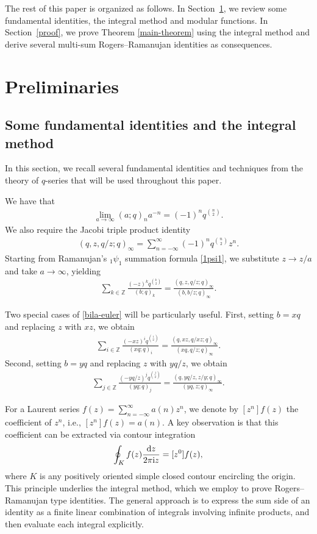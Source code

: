 \documentclass[pdftex]{sigma}
\numberwithin{equation}{section}
\theoremstyle{definition}
\begin{document}
The rest of this paper is organized as follows. In Section~\ref{sec-pre}, we review some fundamental identities, the integral method and modular functions. In Section~\ref{proof}, we prove Theorem \ref{main-theorem} using the integral method and derive several multi-sum Rogers--Ramanujan identities as consequences.

\section{Preliminaries}\label{sec-pre}
\subsection{Some fundamental identities and the integral method}
In this section, we recall several fundamental identities and techniques from the theory of $q$-series that will be used throughout this paper.\par
We have that
\begin{align*}
 \lim_{a\rightarrow \infty}(a;q)_na^{-n}=(-1)^{n}q^{\binom{n}{2}}.
\end{align*}
We also require the Jacobi triple product identity \cite[p.~15]{red}
\begin{align*}
 (q,z,q/z;q)_\infty=\sum_{n=-\infty}^{\infty}(-1)^nq^{\binom{n}{2}}z^n.
\end{align*}
Starting from Ramanujan's $_1\psi_1$ summation formula \eqref{1psi1}, we substitute $z\rightarrow z/a$ and take $a\rightarrow \infty$, yielding
\begin{align}\label{bila-euler}
 \sum_{k\in \mathbb{Z}} \frac{(-z)^kq^{\binom{k}{2}}}{(b;q)_k}=\frac{(q,z,q/z;q)_\infty}{(b,b/z;q)_\infty}.
\end{align}

Two special cases of \eqref{bila-euler} will be particularly useful. First, setting $b=xq$ and replacing $z$ with $xz$, we obtain
\begin{align}\label{circle-1}
 \sum_{i\in \mathbb{Z}} \frac{(-xz)^iq^{\binom{i}{2}}}{(xq;q)_i}=\frac{(q,xz,q/xz;q)_\infty}{(xq,q/z;q)_\infty}.
\end{align}
Second, setting $b=yq$ and replacing $z$ with $yq/z$, we obtain
\begin{align}\label{circle-2}
 \sum_{j\in \mathbb{Z}} \frac{(-yq/z)^jq^{\binom{j}{2}}}{(yq;q)_j}=\frac{(q,yq/z,z/y;q)_\infty}{(yq,z;q)_\infty}.
\end{align}

For a Laurent series \( f(z) = \sum_{n = -\infty}^\infty a(n) z^n \), we denote by \([z^n] f(z)\) the coefficient of \( z^n \), i.e., \([z^n] f(z) = a(n)\). A key observation is that this coefficient can be extracted via contour integration
\begin{align*}
 \oint_K f(z) \frac{{\rm d}z}{2\pi {\rm i} z} = [z^0] f(z),
\end{align*}
where \( K \) is any positively oriented simple closed contour encircling the origin. This principle underlies the integral method, which we employ to prove Rogers--Ramanujan type identities. The general approach is to express the sum side of an identity as a finite linear combination of integrals involving infinite products, and then evaluate each integral explicitly.
\end{document}
